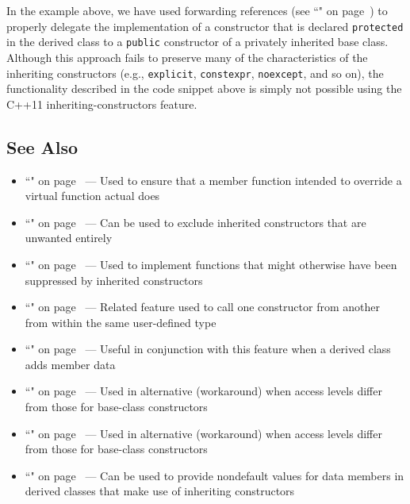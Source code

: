 \noindent In the example above, we have used forwarding references (see ``" on page~\pageref{forwardingref})
to properly delegate the implementation of a constructor that is
declared \mbox{\texttt{protected}} in the derived class to a \texttt{public}
constructor of a privately inherited base class. Although this approach
fails to preserve many of the characteristics of the inheriting
constructors (e.g., \texttt{explicit}, \texttt{constexpr},
\texttt{noexcept}, and so on), the functionality described in the code snippet above is
simply not possible using the C++11 inheriting-constructors feature.

\subsection[See Also]{See Also}\label{see-also}

\begin{itemize}
\item{``" on page~\pageref{override} — Used to ensure that a member function intended to override a virtual function actual does}
\item{``" on page~\pageref{deleted-functions} — Can be used to exclude inherited constructors that are unwanted entirely}
\item{``" on page~\pageref{Defaulted-Special-Member-Functions} — Used to implement functions that might otherwise have been suppressed by inherited constructors}
\item{``" on page~\pageref{delegating-constructors} — Related feature used to call one constructor from another from within the same user-defined type}
\item{``" on page~\pageref{Default-Member-Initializers} — Useful in conjunction with this feature when a derived class adds member data}
\item{``" on page~\pageref{forwardingref} — Used in alternative (workaround) when access levels differ from those for base-class constructors}
\item{``" on page~\pageref{variadictemplate} — Used in alternative (workaround) when access levels differ from those for base-class constructors}
\item{``" on page~\pageref{Default-Member-Initializers} — Can be used to provide nondefault values for data members in derived classes that make use of inheriting constructors}
\end{itemize}

